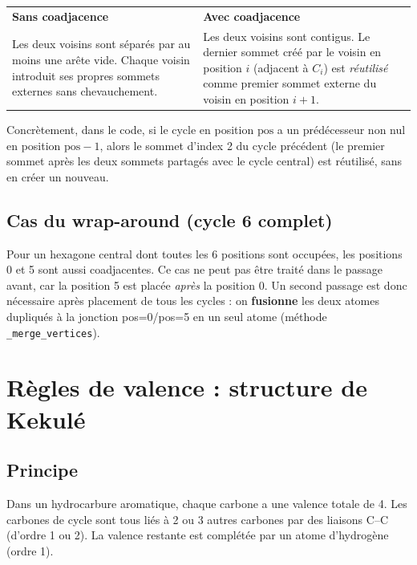 \documentclass[a4paper,12pt]{article}
\begin{document}
\begin{center}
\begin{tabular}{p{7cm}p{7cm}}
  \textbf{Sans coadjacence} & \textbf{Avec coadjacence} \\
  Les deux voisins sont séparés par au moins une arête vide. Chaque voisin introduit ses propres
  sommets externes sans chevauchement. &
  Les deux voisins sont contigus. Le dernier sommet créé par le voisin en position $i$ (adjacent à
  $C_i$) est \textit{réutilisé} comme premier sommet externe du voisin en position $i+1$. \\
\end{tabular}
\end{center}

Concrètement, dans le code, si le cycle en position $\text{pos}$ a un prédécesseur non nul en
position $\text{pos}-1$, alors le sommet d'index 2 du cycle précédent (le premier sommet après
les deux sommets partagés avec le cycle central) est réutilisé, sans en créer un nouveau.

\subsection{Cas du wrap-around (cycle 6 complet)}

Pour un hexagone central dont toutes les 6 positions sont occupées, les positions 0 et 5 sont
aussi coadjacentes. Ce cas ne peut pas être traité dans le passage avant, car la position 5 est
placée \textit{après} la position 0. Un second passage est donc nécessaire après placement de
tous les cycles : on \textbf{fusionne} les deux atomes dupliqués à la jonction pos=0/pos=5 en un
seul atome (méthode \texttt{\_merge\_vertices}).

\section{Règles de valence : structure de Kekulé}

\subsection{Principe}

Dans un hydrocarbure aromatique, chaque carbone a une valence totale de 4. Les carbones de cycle
sont tous liés à 2 ou 3 autres carbones par des liaisons C--C (d'ordre 1 ou 2). La valence
restante est complétée par un atome d'hydrogène (ordre 1).
\end{document}
